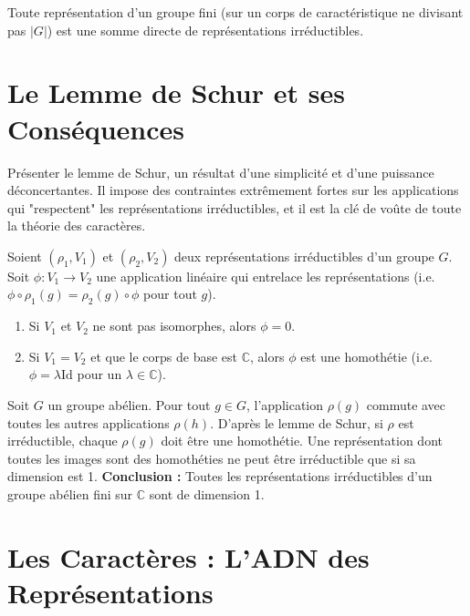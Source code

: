 \begin{corollary}
    Toute représentation d'un groupe fini (sur un corps de caractéristique ne divisant pas $|G|$) est une somme directe de représentations irréductibles.
\end{corollary}

\section{Le Lemme de Schur et ses Conséquences}

\begin{objectif}
    Présenter le lemme de Schur, un résultat d'une simplicité et d'une puissance déconcertantes. Il impose des contraintes extrêmement fortes sur les applications qui "respectent" les représentations irréductibles, et il est la clé de voûte de toute la théorie des caractères.
\end{objectif}

\begin{lemma}
    Soient $(\rho_1, V_1)$ et $(\rho_2, V_2)$ deux représentations irréductibles d'un groupe $G$. Soit $\phi: V_1 \to V_2$ une application linéaire qui entrelace les représentations (i.e. $\phi \circ \rho_1(g) = \rho_2(g) \circ \phi$ pour tout $g$).
    \begin{enumerate}
        \item Si $V_1$ et $V_2$ ne sont pas isomorphes, alors $\phi=0$.
        \item Si $V_1 = V_2$ et que le corps de base est $\mathbb{C}$, alors $\phi$ est une homothétie (i.e. $\phi = \lambda \mathrm{Id}$ pour un $\lambda \in \mathbb{C}$).
    \end{enumerate}
\end{lemma}

\begin{application}
    Soit $G$ un groupe abélien. Pour tout $g \in G$, l'application $\rho(g)$ commute avec toutes les autres applications $\rho(h)$. D'après le lemme de Schur, si $\rho$ est irréductible, chaque $\rho(g)$ doit être une homothétie. Une représentation dont toutes les images sont des homothéties ne peut être irréductible que si sa dimension est 1.
    \textbf{Conclusion :} Toutes les représentations irréductibles d'un groupe abélien fini sur $\mathbb{C}$ sont de dimension 1.
\end{application}

\section{Les Caractères : L'ADN des Représentations}

